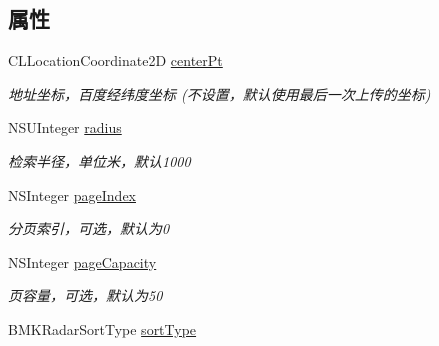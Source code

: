 \subsection*{属性}
\begin{DoxyCompactItemize}
\item 
\hypertarget{interface_b_m_k_radar_nearby_search_option_aacb350d6b41383c19b27a0a4e244c56c}{}C\+L\+Location\+Coordinate2\+D \hyperlink{interface_b_m_k_radar_nearby_search_option_aacb350d6b41383c19b27a0a4e244c56c}{center\+Pt}\label{interface_b_m_k_radar_nearby_search_option_aacb350d6b41383c19b27a0a4e244c56c}

\begin{DoxyCompactList}\small\item\em 地址坐标，百度经纬度坐标 (不设置，默认使用最后一次上传的坐标) \end{DoxyCompactList}\item 
\hypertarget{interface_b_m_k_radar_nearby_search_option_aa986ad91d9c881f69eab93bf9ec4d133}{}N\+S\+U\+Integer \hyperlink{interface_b_m_k_radar_nearby_search_option_aa986ad91d9c881f69eab93bf9ec4d133}{radius}\label{interface_b_m_k_radar_nearby_search_option_aa986ad91d9c881f69eab93bf9ec4d133}

\begin{DoxyCompactList}\small\item\em 检索半径，单位米，默认1000 \end{DoxyCompactList}\item 
\hypertarget{interface_b_m_k_radar_nearby_search_option_a4065d437989f34b21f14415e9e63bc66}{}N\+S\+Integer \hyperlink{interface_b_m_k_radar_nearby_search_option_a4065d437989f34b21f14415e9e63bc66}{page\+Index}\label{interface_b_m_k_radar_nearby_search_option_a4065d437989f34b21f14415e9e63bc66}

\begin{DoxyCompactList}\small\item\em 分页索引，可选，默认为0 \end{DoxyCompactList}\item 
\hypertarget{interface_b_m_k_radar_nearby_search_option_a4c30713a1b36352068322ccd66d5b028}{}N\+S\+Integer \hyperlink{interface_b_m_k_radar_nearby_search_option_a4c30713a1b36352068322ccd66d5b028}{page\+Capacity}\label{interface_b_m_k_radar_nearby_search_option_a4c30713a1b36352068322ccd66d5b028}

\begin{DoxyCompactList}\small\item\em 页容量，可选，默认为50 \end{DoxyCompactList}\item 
\hypertarget{interface_b_m_k_radar_nearby_search_option_a5ef1d3179315c55dc2fea10b9409b4de}{}B\+M\+K\+Radar\+Sort\+Type \hyperlink{interface_b_m_k_radar_nearby_search_option_a5ef1d3179315c55dc2fea10b9409b4de}{sort\+Type}\label{interface_b_m_k_radar_nearby_search_option_a5ef1d3179315c55dc2fea10b9409b4de}


\end{DoxyCompactItemize}
